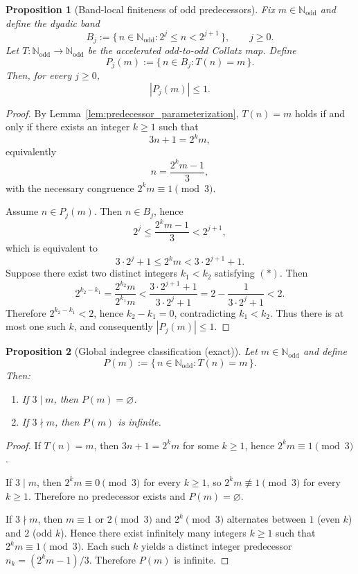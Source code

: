 \documentclass[preprint,12pt]{elsarticle}
\newtheorem{proposition}{Proposition}
\begin{document}
\begin{proposition}[Band-local finiteness of odd predecessors]\label{prop:band_local_finiteness}
Fix $m\in\mathbb{N}_{\mathrm{odd}}$ and define the dyadic band
\[
B_j := \{\, n\in\mathbb{N}_{\mathrm{odd}} : 2^j \le n < 2^{j+1}\,\}, \qquad j\ge 0.
\]
Let $T:\mathbb{N}_{\mathrm{odd}}\to\mathbb{N}_{\mathrm{odd}}$ be the accelerated odd-to-odd Collatz map.
Define
\[
P_j(m):=\{\,n\in B_j : T(n)=m\,\}.
\]
Then, for every $j\ge 0$,
\[
|P_j(m)|\le 1.
\]
\end{proposition}

\begin{proof}
By Lemma~\ref{lem:predecessor_parameterization}, $T(n)=m$ holds if and only if there exists an integer $k\ge 1$ such that
\[
3n+1=2^k m,
\]
equivalently
\[
n=\frac{2^k m-1}{3},
\]
with the necessary congruence $2^k m\equiv 1\pmod 3$.

Assume $n\in P_j(m)$. Then $n\in B_j$, hence
\[
2^j \le \frac{2^k m-1}{3} < 2^{j+1},
\]
which is equivalent to
\[
3\cdot 2^j + 1 \le 2^k m < 3\cdot 2^{j+1}+1. \tag{$\ast$}
\]
Suppose there exist two distinct integers $k_1<k_2$ satisfying $(\ast)$.
Then
\[
2^{k_2-k_1}
=\frac{2^{k_2}m}{2^{k_1}m}
<\frac{3\cdot 2^{j+1}+1}{3\cdot 2^j+1}
=2-\frac{1}{3\cdot 2^j+1}
<2.
\]
Therefore $2^{k_2-k_1}<2$, hence $k_2-k_1=0$, contradicting $k_1<k_2$.
Thus there is at most one such $k$, and consequently $|P_j(m)|\le 1$.
\end{proof}

\begin{proposition}[Global indegree classification (exact)]\label{prop:global_indegree_exact}
Let $m\in\mathbb{N}_{\mathrm{odd}}$ and define
\[
P(m):=\{\,n\in\mathbb{N}_{\mathrm{odd}}:T(n)=m\,\}.
\]
Then:
\begin{enumerate}
\item If $3\mid m$, then $P(m)=\varnothing$.
\item If $3\nmid m$, then $P(m)$ is infinite.
\end{enumerate}
\end{proposition}

\begin{proof}
If $T(n)=m$, then $3n+1=2^k m$ for some $k\ge 1$, hence $2^k m\equiv 1\pmod 3$.

If $3\mid m$, then $2^k m\equiv 0\pmod 3$ for every $k\ge 1$, so $2^k m\not\equiv 1\pmod 3$ for every $k\ge 1$.
Therefore no predecessor exists and $P(m)=\varnothing$.

If $3\nmid m$, then $m\equiv 1$ or $2\pmod 3$ and $2^k\pmod 3$ alternates between $1$ (even $k$) and $2$ (odd $k$).
Hence there exist infinitely many integers $k\ge 1$ such that $2^k m\equiv 1\pmod 3$.
Each such $k$ yields a distinct integer predecessor $n_k=(2^k m-1)/3$.
Therefore $P(m)$ is infinite.
\end{proof}
\end{document}
